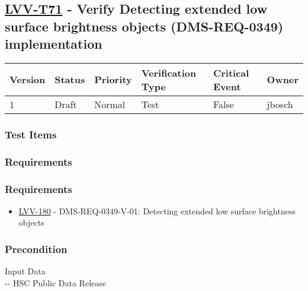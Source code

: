 \hypertarget{lvv-t71---verify-detecting-extended-low-surface-brightness-objects-dms-req-0349-implementation}{%
\subsection{\texorpdfstring{\href{https://jira.lsstcorp.org/secure/Tests.jspa\#/testCase/LVV-T71}{LVV-T71}
- Verify Detecting extended low surface brightness objects
(DMS-REQ-0349)
implementation}{LVV-T71 - Verify Detecting extended low surface brightness objects (DMS-REQ-0349) implementation}}\label{lvv-t71---verify-detecting-extended-low-surface-brightness-objects-dms-req-0349-implementation}}

\begin{longtable}[]{@{}llllll@{}}
\toprule
Version & Status & Priority & Verification Type & Critical Event &
Owner\tabularnewline
\midrule
\endhead
1 & Draft & Normal & Test & False & jbosch\tabularnewline
\bottomrule
\end{longtable}

\hypertarget{test-items-15}{%
\subsubsection{Test Items}\label{test-items-15}}

\hypertarget{requirements-30}{%
\subsubsection{Requirements}\label{requirements-30}}

\hypertarget{requirements-31}{%
\subsubsection{Requirements}\label{requirements-31}}

\begin{itemize}
\tightlist
\item
  \href{https://jira.lsstcorp.org/browse/LVV-180}{LVV-180} -
  DMS-REQ-0349-V-01: Detecting extended low surface brightness objects
\end{itemize}

\hypertarget{precondition-1}{%
\subsubsection{Precondition}\label{precondition-1}}

Input Data\\
\hspace*{0.333em}-\/- HSC Public Data Release

